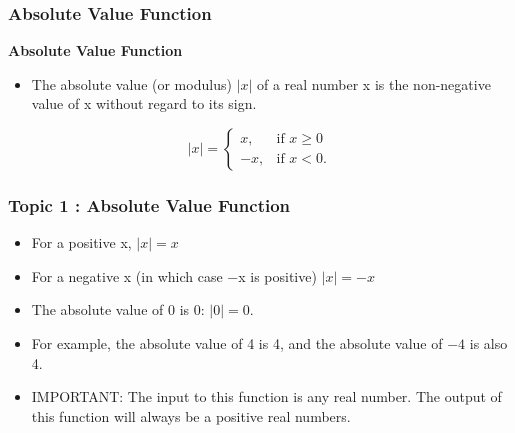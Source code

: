 \documentclass{beamer}
\begin{document}
\begin{frame}
	\frametitle{Absolute Value Function}
	\Large
	\textbf{Absolute Value Function}
	\begin{itemize}
		\item The absolute value (or modulus) $|x|$ of a real number x is the non-negative value of x without regard to its sign. 
		
	\end{itemize}
	\[|x| = \begin{cases} x, & \mbox{if }  x \ge 0  \\ -x,  & \mbox{if } x < 0. \end{cases} \]
\end{frame}
\begin{frame}
	\frametitle{Topic 1 : Absolute Value Function}
	\Large
	\vspace{-1cm}
	\begin{itemize}
		
		\item For a positive x, $|x| = x$ 
		\item For a negative x (in which case −x is positive) $|x| = -x$ 
		\item The absolute value of 0 is 0:  $|0| = 0$. 
		\item For example, the absolute value of 4 is 4, and the absolute value of $-4$ is also 4. 
		\item IMPORTANT:  The input to this function is any real number. The output of this function will always be a positive real numbers.
	\end{itemize}
	
	
\end{frame}
\end{document}
